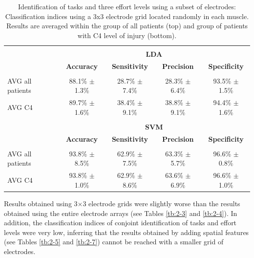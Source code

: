 \begin{table}[]
\centering
\caption{Identification of tasks and three effort levels using a subset of electrodes: Classification indices using a 3x3 electrode grid located randomly in each muscle. Results are averaged within the group of all patients (top) and group of patients with C4 level of injury (bottom).}
\label{2-10}
\begin{tabular}{lcccc}
 & & & &\\
                 & \multicolumn{4}{c}{\large{\textbf{LDA}}}                                                      \\
                 & \textbf{Accuracy}  & \textbf{Sensitivity} & \textbf{Precision} & \textbf{Specificity} \\ \hline
                 &                    &                      &                    &                      \\
AVG all patients & 88.1\% $\pm$ 1.3\% & 28.7\% $\pm$ 7.4\% & 28.3\% $\pm$ 6.4\% & 93.5\% $\pm$ 1.5\% \\
AVG C4           & 89.7\% $\pm$ 1.6\% & 38.4\% $\pm$ 9.1\% & 38.8\% $\pm$ 9.1\% & 94.4\% $\pm$ 1.6\% \\
                 &                    &                      &                    &                      \\
                 & \multicolumn{4}{c}{\large{\textbf{SVM}}}                                                      \\
                 & \textbf{Accuracy}  & \textbf{Sensitivity} & \textbf{Precision} & \textbf{Specificity} \\ \hline
                 &                    &                      &                    &                      \\
AVG all patients & 93.8\% $\pm$ 8.5\% & 62.9\% $\pm$ 7.5\% & 63.3\% $\pm$ 5.7\% & 96.6\% $\pm$ 0.8\% \\
AVG C4           & 93.8\% $\pm$ 1.0\% & 62.9\% $\pm$ 8.6\% & 63.6\% $\pm$ 6.9\% & 96.6\% $\pm$ 1.0\%
\end{tabular}
\end{table}

Results obtained using 3$\times$3 electrode grids were slightly worse than the results obtained using the entire electrode arrays (see Tables \ref{tb:2-3} and \ref{tb:2-4}). In addition, the classification indices of conjoint identification of tasks and effort levels were very low, inferring that the results obtained by adding spatial features (see Tables \ref{tb:2-5} and \ref{tb:2-7}) cannot be reached with a smaller grid of electrodes.


